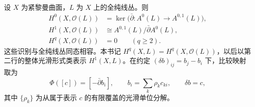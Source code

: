 \begin{theorem}
\label{g4:thm:0302:dolbeault}
设 \(X\) 为紧黎曼曲面，\(L\) 为 \(X\) 上的全纯线丛。则
\begin{equation}
\label{g4:eq:0302:dolbeault-cohomology}
 \begin{aligned}
 H^0(X,\mathcal O(L))&=\ker\bigl(\bar\partial:A^0(L)\to A^{0,1}(L)\bigr),\\
 H^1(X,\mathcal O(L))&\cong A^{0,1}(L)/\bar\partial A^0(L),\\
 H^q(X,\mathcal O(L))&=0\qquad(q\geq2).
 \end{aligned}
\end{equation}
这些识别与全纯线丛同态相容。本书记 \(H^q(X,L)=H^q(X,\mathcal O(L))\)，以后以第二行的整体光滑形式类表示 \(H^1(X,L)\)。在约定 \((\delta b)_{ij}=b_j-b_i\) 下，比较映射取为
\begin{equation}
\label{g4:eq:0302:cech-dolbeault-sign}
 \Phi([c])=[-\bar\partial b_i],\qquad
 b_i=\sum_k\rho_k c_{ki},\qquad \delta b=c,
\end{equation}
其中 \(\{\rho_k\}\) 为从属于表示 \(c\) 的有限覆盖的光滑单位分解。
\end{theorem}
